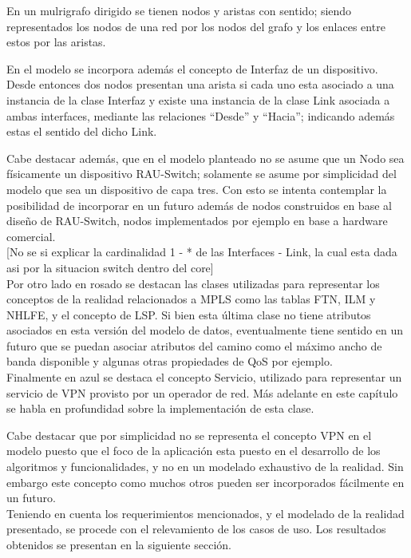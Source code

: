 En un mulrigrafo dirigido se tienen nodos y aristas con sentido; siendo representados los nodos de una red por los nodos del grafo y los enlaces entre estos por las aristas.

En el modelo se incorpora adem\'as el concepto de Interfaz de un dispositivo. Desde entonces dos nodos presentan una arista si cada uno esta asociado a una instancia de la clase Interfaz y existe una instancia de la clase Link asociada a ambas interfaces, mediante las relaciones “Desde” y “Hacia”; indicando adem\'as estas el sentido del dicho Link.

Cabe destacar adem\'as, que en el modelo planteado no se asume que un Nodo sea f\'isicamente un dispositivo RAU-Switch; solamente se asume por simplicidad del modelo que sea un dispositivo de capa tres. Con esto se intenta contemplar la posibilidad de incorporar en un futuro adem\'as de nodos construidos en base al diseño de RAU-Switch, nodos implementados por ejemplo en base a hardware comercial.\\
  
[No se si explicar la cardinalidad 1 - * de las Interfaces - Link, la cual esta dada asi por la situacion switch dentro del core]\\

Por otro lado en rosado se destacan las clases utilizadas para representar los conceptos de la realidad relacionados a MPLS como las tablas FTN, ILM y NHLFE, y el concepto de LSP. Si bien esta \'ultima clase no tiene atributos asociados en esta versi\'on del modelo de datos, eventualmente tiene sentido en un futuro que se puedan asociar atributos del camino como el m\'aximo ancho de banda disponible y algunas otras propiedades de QoS por ejemplo.\\

Finalmente en azul se destaca el concepto Servicio, utilizado para representar un servicio de VPN provisto por un operador de red. M\'as adelante en este cap\'itulo se habla en profundidad sobre la implementaci\'on de esta clase.

Cabe destacar que por simplicidad no se representa el concepto VPN en el modelo puesto que el foco de la aplicación esta puesto en el desarrollo de los algoritmos y funcionalidades, y no en un modelado exhaustivo de la realidad. Sin embargo este concepto como muchos otros pueden ser incorporados fácilmente en un futuro.\\

Teniendo en cuenta los requerimientos mencionados, y el modelado de la realidad presentado, se procede con el relevamiento de los casos de uso. Los resultados obtenidos se presentan en la siguiente secci\'on.

